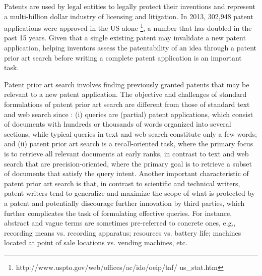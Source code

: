Patents are used by legal entities to legally protect their
inventions and represent a multi-billion dollar industry of licensing
and litigation. In 2013, 302,948 patent applications were approved
in the US alone%
\footnote{http://www.uspto.gov/web/offices/ac/ido/oeip/taf/ us\_stat.htm%
}, a number that has doubled in the past 15 years. Given that a single
existing patent may invalidate a new patent application, helping inventors
assess the patentability of an idea through a patent prior art search
before writing a complete patent application is an important task.

Patent prior art search involves finding previously granted patents
that may be relevant to a new patent application. The objective and
challenges of standard formulations of patent prior art search are
different from those of standard text and web search since \cite{magdy2012toward}:
(i) queries are (partial) patent applications, which consist of documents
with hundreds or thousands of words organized into several sections,
while typical queries in text and web search constitute only a few
words; and (ii) patent prior art search is a recall-oriented task,
where the primary focus is to retrieve all relevant documents at early
ranks, in contrast to text and web search that are precision-oriented,
where the primary goal is to retrieve a subset of documents that satisfy
the query intent. Another important characteristic of patent prior
art search is that, in contrast to scientific and technical writers,
patent writers tend to generalize and maximize the scope of what is
protected\textcolor{red}{{} }by a patent and potentially discourage
further innovation by third parties, which further complicates the
task of formulating effective queries. For instance, abstract and
vague terms are sometimes pre-referred to concrete ones, e.g., recording
means vs. recording apparatus; resources vs. battery life; machines
located at point of sale locations vs. vending machines, etc.

